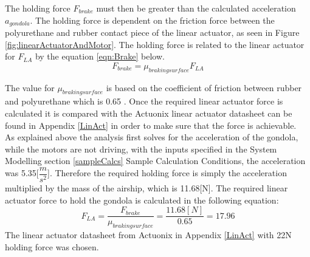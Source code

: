 \documentclass[../main.tex]{subfiles}
\begin{document}
The holding force $F_{brake}$ must then be greater than the calculated acceleration $a_{gondola}$. The holding force is dependent on the friction force between the polyurethane and rubber contact piece of the linear actuator, as seen in Figure \ref{fig:linearActuatorAndMotor}.  The holding force is related to the linear actuator for $F_{LA}$ by the equation \ref{eqn:Brake} below.
\begin{equation}
\label{eqn:Brake}
F_{brake} = \mu_{braking surface} F_{LA}
\end{equation}

The value for $\mu_{braking surface}$ is based on the coefficient of friction between rubber and polyurethane which is 0.65 \cite{Friction}. Once the required linear actuator force is calculated it is compared with the Actuonix linear actuator datasheet can be found in Appendix \ref{LinAct} in order to make sure that the force is achievable.\\

As explained above the analysis first solves for the acceleration of the gondola, while the motors are not driving, with the inputs specified in the System Modelling section \ref{sampleCalcs} Sample Calculation Conditions, the acceleration was 5.35[$\dfrac{m}{s^2}$]. Therefore the required holding force is simply the acceleration multiplied by the mass of the airship, which is 11.68[N]. The required linear actuator force to hold the gondola is calculated in the following equation:
\begin{equation}
\label{eqn:brake}
F_{LA} = \frac{F_{brake}}{\mu_{braking surface} } = \frac{11.68[N]}{0.65} = 17.96
\end{equation}
The linear actuator datasheet from Actuonix in Appendix \ref{LinAct} with 22N holding force was chosen. 
\end{document}
